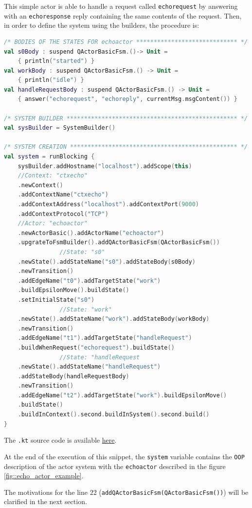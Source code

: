 This simple actor is able to handle a request called \texttt{echorequest} by answering with an \texttt{echoresponse} reply containing the same contents of the request.
Then, in order to define the system using the builders, the procedure is:


\begin{lstlisting}[caption={Example of builders use},label={lst::echoexample},language=kotlin]
/* BODIES OF THE STATES FOR echoactor ***************************** */
val s0Body : suspend QActorBasicFsm.()-> Unit =
	{ println("started") }
val workBody : suspend QActorBasicFsm.() -> Unit =
	{ println("idle") }
val handleRequestBody : suspend QActorBasicFsm.() -> Unit =
	{ answer("echorequest", "echoreply", currentMsg.msgContent()) }

/* SYSTEM BUILDER ************************************************* */
val sysBuilder = SystemBuilder()

/* SYSTEM CREATION ************************************************ */
val system = runBlocking {
	sysBuilder.addHostname("localhost").addScope(this)
	//Context: "ctxecho"
	.newContext()
	.addContextName("ctxecho")
	.addContextAddress("localhost").addContextPort(9000)
	.addContextProtocol("TCP")
	//Actor: "echoactor"
	.newActorBasic().addActorName("echoactor")
	.upgrateToFsmBuilder().addQActorBasicFsm(QActorBasicFsm())
				//State: "s0"
	.newState().addStateName("s0").addStateBody(s0Body)
	.newTransition()
	.addEdgeName("t0").addTargetState("work")
	.buildEpsilonMove().buildState()
	.setInitialState("s0")
				//State: "work"
	.newState().addStateName("work").addStateBody(workBody)
	.newTransition()
	.addEdgeName("t1").addTargetState("handleRequest")
	.buildWhenRequest("echorequest").buildState()
				//State: "handleRequest
	.newState().addStateName("handleRequest")
	.addStateBody(handleRequestBody)
	.newTransition()
	.addEdgeName("t2").addTargetState("work").buildEpsilonMove()
	.buildState()
	.buildInContext().second.buildInSystem().second.build()
}
\end{lstlisting}

The \texttt{.kt} source code is available \href{https://github.com/LM-96/QA-Extensions/blob/main/it.unibo.qakactor/src/main/kotlin/demo/EchoExample.kt}{here}.

At the end of the execution of this snippet, the \verb*|system| variable contains the \texttt{OOP} description of the actor system with the \texttt{echoactor} described in the figure \ref{fig::echo_actor_example}.

The motivations for the line $22$ (\verb*|addQActorBasicFsm(QActorBasicFsm())|) will be clarified in the next section.

